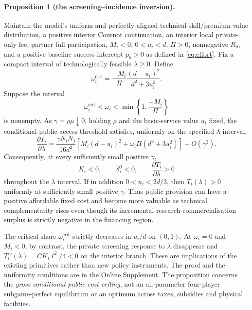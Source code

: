 \paragraph{Proposition 1 (the screening--incidence inversion).}\label{prop:inversion}
Maintain the model's uniform and perfectly aligned technical-skill/premium-value distribution, a positive interior Cournot continuation, an interior local private-only fee, partner full participation, $M_i<0$, $0<u_i<d$, $\Pi>0$, nonnegative $R_0$, and a positive baseline success intercept $p_b>0$ as defined in \eqref{eq:effort}. Fix a compact interval of technologically feasible $\lambda\geq0$. Define
\begin{equation}
 \omega_i^{\mathrm{crit}}
 =\frac{-M_i}{\Pi}
     \frac{(d-u_i)^2}{d^2+3u_i^2}.
 \label{eq:omega-critical}
\end{equation}
Suppose the interval
\begin{equation}
 \boxed{\qquad
 \omega_i^{\mathrm{crit}}<\omega_i<
            \min\left\{1,\frac{-M_i}{\Pi}\right\}
 \qquad}
 \label{eq:screen-inversion-band}
\end{equation}
is nonempty. As $\gamma=\rho\mu\downarrow0$, holding $\rho$ and the basic-service value $u_i$ fixed, the conditional public-access threshold satisfies, uniformly on the specified $\lambda$ interval,
\begin{equation}
 \frac{\partial T_i}{\partial\lambda}
  =\frac{\gamma N_iN_j}{16d^2}
    \left[M_i(d-u_i)^2+
          \omega_i\Pi(d^2+3u_i^2)\right]
       +O(\gamma^2).
 \label{eq:main-primitive-slope}
\end{equation}
Consequently, at every sufficiently small positive $\gamma$,
\begin{equation}
 K_i<0,\qquad S_i^0<0,\qquad
 \frac{\partial T_i}{\partial\lambda}>0
 \label{eq:main-inversion}
\end{equation}
throughout the $\lambda$ interval. If in addition $0<u_i<2d/3$, then $T_i(\lambda)>0$ uniformly at sufficiently small positive $\gamma$. Thus public provision can have a positive affordable fixed cost and become more valuable as technical complementarity rises even though its incremental research-commercialisation surplus is strictly negative in the financing region.

The critical share $\omega_i^{\mathrm{crit}}$ strictly decreases in $u_i/d$ on $(0,1)$. At $\omega_i=0$ and $M_i<0$, by contrast, the private screening response to $\lambda$ disappears and $T_i'(\lambda)=CK_i\ell^2/4<0$ on the interior branch. These are implications of the existing primitives rather than new policy instruments. The proof and the uniformity conditions are in the Online Supplement. The proposition concerns the \emph{gross conditional public cost ceiling}, not an all-parameter four-player subgame-perfect equilibrium or an optimum across taxes, subsidies and physical facilities.

